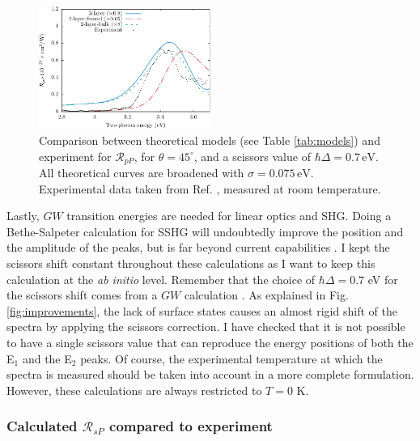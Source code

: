 \begin{figure}[H]
\centering
\includegraphics[width=0.5\textwidth]{content/figures/fig-Si1x1-Mitchell_RpP}
\caption{Comparison between theoretical models (see Table \ref{tab:models}) and experiment for $\mathcal{R}_{pP}$, for $\theta=45^{\circ}$, and a scissors value of $\hbar\Delta = 0.7\,\text{eV}$. All theoretical curves are broadened with $\sigma=0.075\,\text{eV}$. Experimental data taken from Ref. \cite{mitchellSS01}, measured at room temperature.}
\label{fig:mitchellRpP}
\end{figure}

Lastly, $GW$ transition energies are needed for linear optics and SHG. Doing a Bethe-Salpeter calculation for SSHG will undoubtedly improve the position and the amplitude of the peaks, but is far beyond current capabilities \cite{puff}. I kept the scissors shift constant throughout these calculations as I want to keep this calculation at the {\em ab initio} level. Remember that the choice of $\hbar\Delta=0.7$ eV for the scissors shift comes from a $GW$ calculation \cite{liPRB10}. As explained in Fig. \ref{fig:improvements}, the lack of surface states causes an almost rigid shift of the spectra by applying the scissors correction. I have checked that it is not possible to have a single scissors value that can reproduce the energy positions of both the E$_{1}$ and the E$_{2}$ peaks. Of course, the experimental temperature at which the spectra is measured should be taken into account in a more complete formulation. However, these calculations are always restricted to $T=0$ K.



\subsubsection{Calculated \texorpdfstring{$\mathcal{R}_{sP}$}{RsP} compared to 
experiment}\label{sec:1x1RsP}

